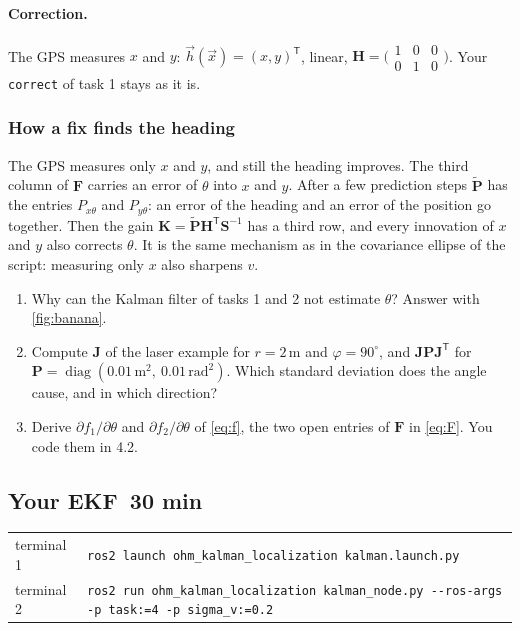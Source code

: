 \documentclass[11pt,a4paper,parskip=half]{scrartcl}
\makeatletter
\newcommand{\thema}[1]{\texttt{#1}}
\newcommand{\minutes}[1]{\texorpdfstring{\hfill{\normalsize\mdseries\color{ohmgrey}\faClock[regular]~#1 min}}{}}
\newcommand{\mat}[1]{\mathbf{#1}}
\newcommand{\T}{^{\mathsf{T}}}
\newcommand{\solution}[1]{\ifdefined\withsolution\InputIfFileExists{solutions/#1}{}{}\fi}
\newcommand{\running}[2]{\begin{tcolorbox}[base, colback=black!3, borderline west={2.5pt}{0pt}{ohmgrey},
        title={\faTerminal~Running}, coltitle=ohmgrey, colbacktitle=black!3, fonttitle=\small\bfseries,
        toptitle=2pt, bottomtitle=0pt, fontupper=\small]
  \begin{tabularx}{\linewidth}{@{}>{\color{ohmgrey}}l >{\raggedright\arraybackslash}X@{}}
    terminal 1 & \texttt{ros2 launch ohm\_kalman\_localization kalman.launch.py#1} \\
    terminal 2 & \texttt{ros2 run ohm\_kalman\_localization kalman\_node.py -\kern0pt-ros-args #2}
  \end{tabularx}
\end{tcolorbox}}
\makeatother
\begin{document}
\paragraph{Correction.} The GPS measures \(x\) and \(y\): \(\vec h(\vec x) = (x, y)\T\), linear,
\(\mat H = \big(\begin{smallmatrix}1&0&0\\0&1&0\end{smallmatrix}\big)\). Your \thema{correct} of task 1 stays as it is.

\subsubsection*{How a fix finds the heading}
The GPS measures only \(x\) and \(y\), and still the heading improves. The third column of \(\mat F\) carries an
error of \(\theta\) into \(x\) and \(y\). After a few prediction steps \(\tilde{\mat P}\) has the entries
\(P_{x\theta}\) and \(P_{y\theta}\): an error of the heading and an error of the position go together. Then the gain
\(\mat K = \tilde{\mat P} \mat H\T \mat S^{-1}\) has a third row, and every innovation of \(x\) and \(y\) also corrects
\(\theta\). It is the same mechanism as in the covariance ellipse of the script: measuring only \(x\) also sharpens \(v\).

\begin{questions}
\begin{enumerate}
  \item Why can the Kalman filter of tasks 1 and 2 not estimate \(\theta\)? Answer with \cref{fig:banana}.
  \item Compute \(\mat J\) of the laser example for \(r = 2\)\,m and \(\varphi = 90^\circ\), and
        \(\mat J \mat P \mat J\T\) for \(\mat P = \operatorname{diag}(0.01\,\text{m}^2,\ 0.01\,\text{rad}^2)\).
        Which standard deviation does the angle cause, and in which direction?
  \item Derive \(\partial f_1/\partial\theta\) and \(\partial f_2/\partial\theta\) of \cref{eq:f}, the two open
        entries of \(\mat F\) in \cref{eq:F}. You code them in 4.2.
\end{enumerate}
\end{questions}
\solution{theory_task4}

\newpage
\subsection{Your EKF\minutes{30}}
\label{sec:ekf-code}
\running{}{-p task:=4 -p sigma\_v:=0.2}
\end{document}
